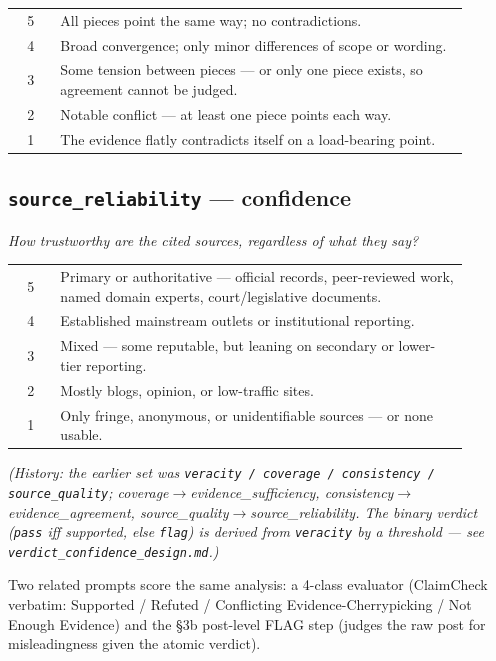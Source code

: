 \documentclass[11pt]{article}
\begin{document}
\begin{longtable}{@{}c>{\raggedright\arraybackslash}p{0.9\linewidth}@{}}
\toprule
5 & All pieces point the same way; no contradictions. \\
4 & Broad convergence; only minor differences of scope or wording. \\
3 & Some tension between pieces --- or only one piece exists, so agreement cannot be judged. \\
2 & Notable conflict --- at least one piece points each way. \\
1 & The evidence flatly contradicts itself on a load-bearing point. \\
\bottomrule
\end{longtable}

\subsection*{\texttt{source\_reliability} --- confidence}
\emph{How trustworthy are the cited sources, regardless of what they say?}

\begin{longtable}{@{}c>{\raggedright\arraybackslash}p{0.9\linewidth}@{}}
\toprule
5 & Primary or authoritative --- official records, peer-reviewed work, named domain experts,
court/legislative documents. \\
4 & Established mainstream outlets or institutional reporting. \\
3 & Mixed --- some reputable, but leaning on secondary or lower-tier reporting. \\
2 & Mostly blogs, opinion, or low-traffic sites. \\
1 & Only fringe, anonymous, or unidentifiable sources --- or none usable. \\
\bottomrule
\end{longtable}

\emph{(History: the earlier set was \texttt{veracity / coverage / consistency /
source\_quality}; coverage$\rightarrow$evidence\_sufficiency,
consistency$\rightarrow$evidence\_agreement, source\_quality$\rightarrow$source\_reliability.
The binary verdict (\texttt{pass} iff supported, else \texttt{flag}) is derived from
\texttt{veracity} by a threshold --- see \texttt{verdict\_confidence\_design.md}.)}

Two related prompts score the same analysis: a 4-class evaluator (ClaimCheck verbatim:
Supported / Refuted / Conflicting Evidence-Cherrypicking / Not Enough Evidence) and the
\S3b post-level FLAG step (judges the raw post for misleadingness given the atomic verdict).
\end{document}
